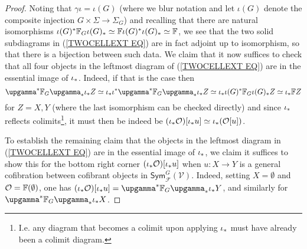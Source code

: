 \documentclass[a4paper,10pt]{article}%
\begin{document}
\begin{proof}
Noting that $\gamma \iota = \iota(G)$
(where we blur notation and let $\iota(G)$ denote the composite injection $G \times \Sigma \to \Sigma_{G}$)
and recalling that there are natural isomorphisms 
$\iota(G)^{\**} \mathbb{F}_{G} \iota(G)_{\**}
\simeq  \mathbb{F} \iota(G)^{\**} \iota(G)_{\**} \simeq \mathbb{F}$, we see that the two solid subdiagrams in 
(\ref{TWOCELLEXT EQ})
are in fact adjoint up to isomorphism, so that there is a bijection between such data. 
We claim that it now suffices to check that all four objects in the leftmost diagram of (\ref{TWOCELLEXT EQ})
are in the essential image of $\iota_{\**}$.
Indeed, if that is the case then
\[
\upgamma^* \mathbb{F}_G \upgamma_* \iota_{\**} Z \simeq 
\iota_{\**} \iota^{\**} \upgamma^{\**} \mathbb F_G \upgamma_{\**} \iota_{\**} Z \simeq
\iota_{\**} \iota(G)^{\**} \mathbb F_G \iota(G)_{\**} Z \simeq
\iota_{\**} \mathbb F Z
\]
for $Z=X,Y$
(where the last isomorphism can be checked directly)
and since $\iota_{\**}$ reflects colimits\footnote{I.e. any diagram that becomes a colimit upon applying $\iota_{\**}$ must have already been a colimit diagram.},
 it must then be
indeed be 
$(\iota_{\**} \mathcal{O})[\iota_{\**} u]
\simeq \iota_{\**} (\mathcal{O}[u])$.


To establish the remaining claim that the objects 
in the leftmost diagram in
(\ref{TWOCELLEXT EQ})
are in the essential image of $\iota_{\**}$,
we claim
it suffices to show this for the bottom right corner 
$(\iota_{\**} \mathcal{O})[\iota_{\**} u]$ when $u \colon X \to Y$ is a general cofibration between cofibrant objects in 
$\mathsf{Sym}^{G}_{\mathcal{F}}(\mathcal{V})$.
Indeed, setting  $X=\emptyset$ and $\mathcal{O}=\mathbb{F} (\emptyset)$, 
one has 
$(\iota_{\**} \mathcal{O})[\iota_{\**} u] = 
\upgamma^* \mathbb{F}_{G} \upgamma_* \iota_{\**} Y$, and similarly for $\upgamma^* \mathbb{F}_{G} \upgamma_* \iota_{\**} X$.


\end{proof}
\end{document}
